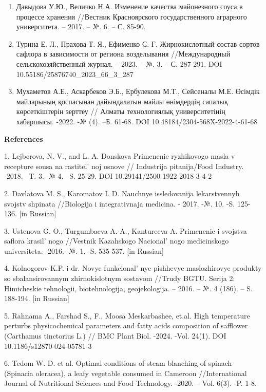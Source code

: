 {\begin{enumerate}
  content in New Zealand spinach //Journal of Fruit and Ornamental Plant
  Research. -2007. --Vol. 66(1). -- P. 95-103. DOI
  10.2478/v10032-007-0012-x
\item
  Давыдова У.Ю., Величко Н.А. Изменение качества майонезного соуса в
  процессе хранения //Вестник Красноярского государственного аграрного
  университета. -- 2017. -- №. 6. -- С. 85-90.
\item
  Турина Е. Л., Прахова Т. Я., Ефименко С. Г. Жирнокислотный состав
  сортов сафлора в зависимости от региона возделывания //Международный
  сельскохозяйственный журнал. -- 2023. -- №. 3. -- С. 287-291. DOI
  10.55186/25876740\_2023\_66\_3\_287
\item
  Мухаметов А.Е., Аскарбеков Э.Б., Ербулекова М.Т., Сейсеналы М.Е.
  Өсімдік майларының қоспасынан дайындалатын майлы өнімдердің сапалық
  көрсеткіштерін зерттеу // Алматы технологиялық университетінің
  хабаршысы. -2022. -№ (4). --Б. 61-68. DOI
  10.48184/2304-568X-2022-4-61-68
\end{enumerate}

{\bfseries References}

1. Lejberova, N. V., and L. A. Donskova Primenenie ryzhikovogo masla v
recepture sousa na rastitel' noj osnove // Industrija
pitanija/Food Industry. -2018. --T. 3. -№ 4. --S. 25-29. DOI
10.29141/2500-1922-2018-3-4-2

2. Davlatova M. S., Karomatov I. D. Nauchnye issledovanija lekarstvennyh
svojstv shpinata //Biologija i integrativnaja medicina. - 2017. -№. 10.
-S. 125-136. {[}in Russian{]}

3. Ustenova G. O., Turgumbaeva A. A., Kantureeva A. Primenenie i
svojstva saflora krasil' nogo //Vestnik Kazahskogo
Nacional' nogo medicinskogo universiteta. -2016. -№. 1.
-S. 535-537. {[}in Russian{]}

4. Kolnogorov K.P. i dr. Novye funkcional' nye pishhevye
maslozhirovye produkty so sbalansirovannym zhirnokislotnym sostavom
//Trudy BGTU. Serija 2: Himicheskie tehnologii, biotehnologija,
geojekologija. -- 2016. -- №. 4 (186). -- S. 188-194. {[}in Russian{]}

5. Rahnama A., Farshad S., F., Moosa Meskarbashee, et.al. High
temperature perturbs physicochemical parameters and fatty acids
composition of safflower (Carthamus tinctorius L.) // BMC Plant Biol.
-2024. -Vol. 24(1). DOI 10.1186/s12870-024-05781-3

6. Tedom W. D. et al. Optimal conditions of steam blanching of spinach
(Spinacia oleracea), a leafy vegetable consumed in Cameroon
//International Journal of Nutritional Sciences and Food Technology.
-2020. -- Vol. 6(3). -P. 1-8.

}
